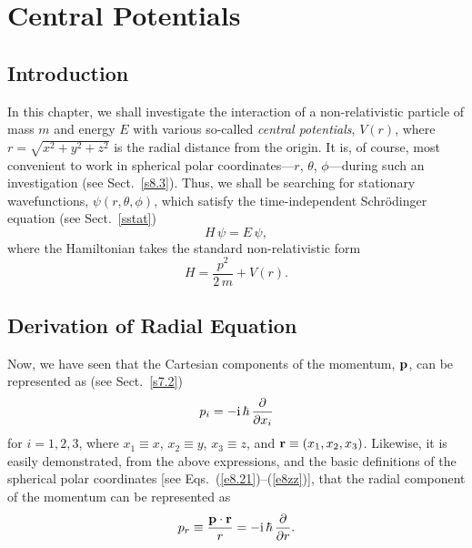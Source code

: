 \chapter{Central Potentials}\label{scent}
\section{Introduction}
In this chapter, we shall investigate the interaction of a non-relativistic
particle of mass $m$ and energy $E$ with various so-called {\em central potentials},
$V(r)$, where $r=\sqrt{x^2+y^2+z^2}$ is the radial distance from the origin.
It is, of course, most convenient
 to work in spherical polar coordinates---$r$, $\theta$,  $\phi$---during such an investigation (see Sect.~\ref{s8.3}). Thus, we shall be searching for stationary
wavefunctions, $\psi(r,\theta,\phi)$, which satisfy the time-independent
Schr\"{o}dinger equation (see Sect.~\ref{sstat})
\begin{equation}\label{e9.1}
H\,\psi = E\,\psi,
\end{equation}
where the  Hamiltonian takes the standard non-relativistic  form
\begin{equation}\label{e9.2}
H = \frac{p^2}{2\,m} + V(r).
\end{equation}

\section{Derivation of Radial Equation}\label{srad}
Now, we have seen that the Cartesian components of the momentum, ${\bf p}$,
can be represented as (see Sect.~\ref{s7.2})
\begin{equation}
p_i = -{\rm i}\,\hbar\,\frac{\partial}{\partial x_i}
\end{equation}
for $i=1,2,3$, where $x_1\equiv x$, $x_2\equiv y$, $x_3\equiv z$, and ${\bf r}\equiv (x_1, x_2, x_3)$. Likewise, it is easily demonstrated,
from the above expressions, and the basic definitions of the spherical polar coordinates
[see Eqs.~(\ref{e8.21})--(\ref{e8zz})],  that the radial component
of the momentum can be represented as
\begin{equation}\label{e9.4}
p_r \equiv \frac{{\bf p}\cdot{\bf r}}{r} = -{\rm i}\,\hbar\,\frac{\partial}{\partial r}.
\end{equation}

